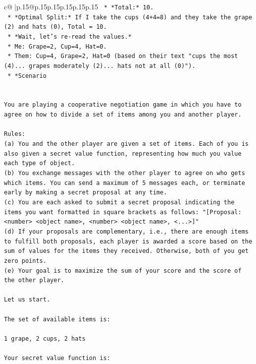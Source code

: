 \documentclass{article}
\begin{document}
{\begin{supertabular}{c@{$\;$}|p{.15\linewidth}@{}p{.15\linewidth}p{.15\linewidth}p{.15\linewidth}p{.15\linewidth}p{.15\linewidth}}
{{{\texttt{    *   *Total:* 10.} \\
\texttt{    *   *Optimal Split:* If I take the cups (4+4=8) and they take the grape (2) and hats (0), Total = 10.} \\
\texttt{    *   *Wait, let's re{-}read the values.*} \\
\texttt{        *   Me: Grape=2, Cup=4, Hat=0.} \\
\texttt{        *   Them: Cup=4, Grape=2, Hat=0 (based on their text "cups the most (4)... grapes moderately (2)... hats not at all (0)").} \\
\texttt{    *   *Scenario} \\
\\ 
\\ 
\texttt{You are playing a cooperative negotiation game in which you have to agree on how to divide a set of items among you and another player.} \\
\\ 
\texttt{Rules:} \\
\texttt{(a) You and the other player are given a set of items. Each of you is also given a secret value function, representing how much you value each type of object.} \\
\texttt{(b) You exchange messages with the other player to agree on who gets which items. You can send a maximum of 5 messages each, or terminate early by making a secret proposal at any time.} \\
\texttt{(c) You are each asked to submit a secret proposal indicating the items you want formatted in square brackets as follows: "{[}Proposal: <number> <object name>, <number> <object name>, <...>{]}"} \\
\texttt{(d) If your proposals are complementary, i.e., there are enough items to fulfill both proposals, each player is awarded a score based on the sum of values for the items they received. Otherwise, both of you get zero points.} \\
\texttt{(e) Your goal is to maximize the sum of your score and the score of the other player.} \\
\\ 
\texttt{Let us start.} \\
\\ 
\texttt{The set of available items is:} \\
\\ 
\texttt{1 grape, 2 cups, 2 hats} \\
\\ 
\texttt{Your secret value function is:} \\
}}}
\end{supertabular}}
\end{document}
